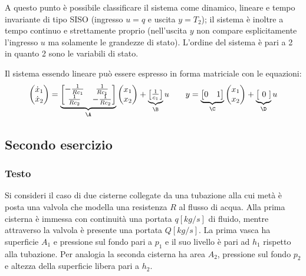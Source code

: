 		A questo punto è possibile classificare il sistema come dinamico, lineare e tempo invariante di tipo SISO (ingresso $u=q$ e uscita $y =T_2$); il sistema è inoltre a tempo continuo e strettamente proprio (nell'uscita $y$ non compare esplicitamente l'ingresso $u$ ma solamente le grandezze di stato). L'ordine del sistema è pari a 2 in quanto 2 sono le variabili di stato.
		
		Il sistema essendo lineare può essere espresso in forma matriciale con le equazioni:
		\[ \begin{pmatrix}
			\dot x_1 \\ \dot x_2
		\end{pmatrix} = \underbrace{\begin{bmatrix}
			-\frac 1 {Rc_1} & \frac 1 {Rc_1} \\
			\frac 1 {Rc_2} & -\frac 1 {Rc_2} \\
		\end{bmatrix}}_\A \begin{pmatrix}
			x_1 \\ x_2
		\end{pmatrix} + \underbrace{\begin{bmatrix}
			\frac 1 {c_1}
		\end{bmatrix} }_\B u  \qquad y = \underbrace{\begin{bmatrix}
			0 & 1 
		\end{bmatrix}}_\C \begin{pmatrix}
			x_1 \\ x_2
		\end{pmatrix} + \underbrace{\big[\ 0 \ ]}_\D u\]
		
		
\subsection*{Secondo esercizio}
	\subsubsection{Testo}
		Si consideri il caso di due cisterne collegate da una tubazione alla cui metà è posta una valvola che modella una resistenza $R$ al flusso di acqua. Alla prima cisterna è immessa con continuità una portata $q [kg/s]$  di fluido, mentre attraverso la valvola è presente una portata $Q [kg/s]$. La prima vasca ha superficie $A_1$ e pressione sul fondo pari a $p_1$ e il suo livello è pari ad $h_1$ rispetto alla tubazione. Per analogia la seconda cisterna ha area $A_2$, pressione sul fondo $p_2$ e altezza della superficie libera pari a $h_2$.
		\begin{center}
		\end{center}
		
